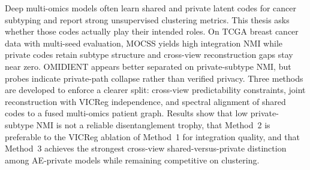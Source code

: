\documentclass[english, 12pt, a4paper, sci, utf8, a-2b, online]{aaltothesis}
\begin{document}
\begin{abstractpage}[english]
  Deep multi-omics models often learn shared and private latent codes for cancer
  subtyping and report strong unsupervised clustering metrics. This thesis asks
  whether those codes actually play their intended roles. On TCGA breast cancer
  data with multi-seed evaluation, MOCSS yields high integration NMI while private
  codes retain subtype structure and cross-view reconstruction gaps stay near zero.
  OMIDIENT appears better separated on private-subtype NMI, but probes indicate
  private-path collapse rather than verified privacy. Three methods are developed
  to enforce a clearer split: cross-view predictability constraints, joint
  reconstruction with VICReg independence, and spectral alignment of shared codes
  to a fused multi-omics patient graph. Results show that low private-subtype NMI
  is not a reliable disentanglement trophy, that Method~2 is preferable to the
  VICReg ablation of Method~1 for integration quality, and that Method~3 achieves
  the strongest cross-view shared-versus-private distinction among AE-private
  models while remaining competitive on clustering.



  
\end{abstractpage}
\end{document}
